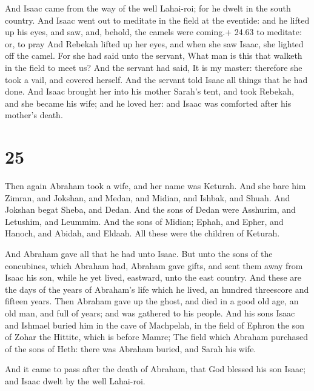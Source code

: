 And Isaac came from the way of the well Lahai-roi; for he
dwelt in the south country.  And Isaac went out to meditate
in the field at the eventide: and he lifted up his eyes, and saw, and,
behold, the camels were coming.+ 24.63 to meditate: or, to pray
 And Rebekah lifted up her eyes, and when she saw Isaac,
she lighted off the camel.  For she had said unto the
servant, What man is this that walketh in the field to meet us? And the
servant had said, It is my master: therefore she took a vail, and
covered herself.  And the servant told Isaac all things
that he had done.  And Isaac brought her into his mother
Sarah's tent, and took Rebekah, and she became his wife; and he loved
her: and Isaac was comforted after his mother's death.

\hypertarget{section-24}{%
\section{25}\label{section-24}}

 Then again Abraham took a wife, and her name was Keturah.
 And she bare him Zimran, and Jokshan, and Medan, and
Midian, and Ishbak, and Shuah.  And Jokshan begat Sheba, and
Dedan. And the sons of Dedan were Asshurim, and Letushim, and Leummim.
 And the sons of Midian; Ephah, and Epher, and Hanoch, and
Abidah, and Eldaah. All these were the children of Keturah.

 And Abraham gave all that he had unto Isaac. 
But unto the sons of the concubines, which Abraham had, Abraham gave
gifts, and sent them away from Isaac his son, while he yet lived,
eastward, unto the east country.  And these are the days of
the years of Abraham's life which he lived, an hundred threescore and
fifteen years.  Then Abraham gave up the ghost, and died in
a good old age, an old man, and full of years; and was gathered to his
people.  And his sons Isaac and Ishmael buried him in the
cave of Machpelah, in the field of Ephron the son of Zohar the Hittite,
which is before Mamre;  The field which Abraham purchased
of the sons of Heth: there was Abraham buried, and Sarah his wife.

 And it came to pass after the death of Abraham, that God
blessed his son Isaac; and Isaac dwelt by the well Lahai-roi.

